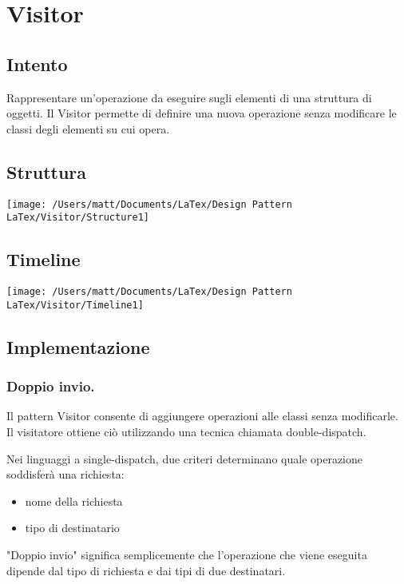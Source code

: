 \chapter{Visitor}
\section{Intento}

Rappresentare un'operazione da eseguire sugli elementi di una struttura di oggetti. Il Visitor permette di definire una nuova operazione senza modificare le classi degli elementi su cui opera.


\section{Struttura}

\texttt{[image: /Users/matt/Documents/LaTex/Design Pattern LaTex/Visitor/Structure1]}


\section{Timeline}

\texttt{[image: /Users/matt/Documents/LaTex/Design Pattern LaTex/Visitor/Timeline1]}


\section{Implementazione}

\subsection{Doppio invio.} 
Il pattern Visitor consente di aggiungere operazioni alle classi senza modificarle. Il visitatore ottiene ciò utilizzando una tecnica chiamata double-dispatch.

Nei linguaggi a single-dispatch, due criteri determinano quale operazione soddisferà una richiesta:

\begin{itemize}
    \item nome della richiesta
    \item tipo di destinatario
\end{itemize}

"Doppio invio" significa semplicemente che l'operazione che viene eseguita dipende dal tipo di richiesta e dai tipi di due destinatari.

